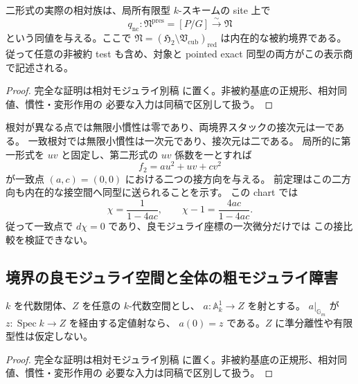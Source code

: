 \begin{theorem}[二形式表示は内在的被約境界を表す]
\label{thm:noncubic-intrinsic-presentation-equivalence}
二形式の実際の相対族は、局所有限型 $k$-スキームの site 上で
\[
 q_{\mathrm{nc}}:\mathfrak N^{\mathrm{pres}}=[P/G]
  \xrightarrow{\ \sim\ }\mathfrak N
\]
という同値を与える。ここで
$\mathfrak N=(\mathfrak H_2\setminus\mathfrak V_{\mathrm{cub}})_{\mathrm{red}}$
は内在的な被約境界である。従って任意の非被約 test も含め、対象と
pointed exact 同型の両方がこの表示商で記述される。
\end{theorem}
\begin{proof}
完全な証明は相対モジュライ別稿
\cite[noncubic 境界の相対表示とモジュライ写像]{QuadricModuli2026}
に置く。非被約基底の正規形、相対同値、慣性・変形作用の
必要な入力は同稿で区別して扱う。
\end{proof}

\begin{remark}[一致根対における二つの接方向]
根対が異なる点では無限小慣性は零であり、両境界スタックの接次元は一である。
一致根対では無限小慣性は一次元であり、接次元は二である。
局所的に第一形式を $uv$ と固定し、第二形式の $uv$ 係数を一とすれば
\[
 f_2=a u^2+uv+c v^2
\]
が一致点 $(a,c)=(0,0)$ における二つの接方向を与える。
前定理はこの二方向も内在的な接空間へ同型に送られることを示す。
この chart では
\[
 \chi=\frac{1}{1-4ac},\qquad
 \chi-1=\frac{4ac}{1-4ac}.
\]
従って一致点で $d\chi=0$ であり、良モジュライ座標の一次微分だけでは
この接比較を検証できない。
\end{remark}

\subsection{境界の良モジュライ空間と全体の粗モジュライ障害}

\begin{lemma}[定値な穿孔直線の特殊化]
\label{lem:constant-punctured-line-space}
$k$ を代数閉体、$Z$ を任意の $k$-代数空間とし、
$a:\mathbb A^1_k\to Z$ を射とする。
$a|_{\mathbb G_m}$ が $z:\operatorname{Spec}k\to Z$ を経由する定値射なら、
$a(0)=z$ である。$Z$ に準分離性や有限型性は仮定しない。
\end{lemma}
\begin{proof}
完全な証明は相対モジュライ別稿
\cite[noncubic 境界の相対表示とモジュライ写像]{QuadricModuli2026}
に置く。非被約基底の正規形、相対同値、慣性・変形作用の
必要な入力は同稿で区別して扱う。
\end{proof}

